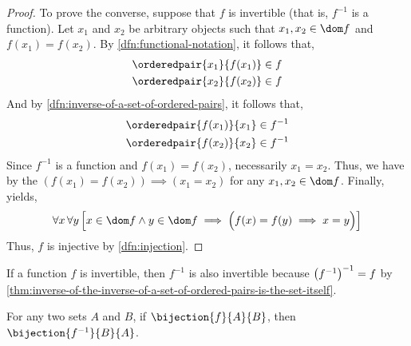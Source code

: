 \begin{proof}
    \vspace{0.3cm}
    \noindent
    To prove the converse, suppose that  \( f \) is invertible (that is, \( f^{-1} \) is a function).
    Let \( x_{1} \) and \( x_{2} \) be arbitrary objects such that \( x_{1},x_{2} \in \dom f \)
    and \( f(x_{1}) = f(x_{2}) \). By
    \cref{dfn:functional-notation}, it follows that,
    \begin{gather*}
        \orderedpair{x_{1}}{f(x_{1})} \in f \\
        \orderedpair{x_{2}}{f(x_{2})} \in f
    \end{gather*}
    And by \cref{dfn:inverse-of-a-set-of-ordered-pairs}, it follows that,
    \begin{gather*}
        \orderedpair{f(x_{1})}{x_{1}} \in f^{-1} \\
        \orderedpair{f(x_{2})}{x_{2}} \in f^{-1}
    \end{gather*}
    Since \( f^{-1} \) is a function and \( f(x_{1}) = f(x_{2}) \), necessarily \( x_{1} = x_{2} \).
    Thus, we have by the  \( (f(x_{1}) = f(x_{2})) {\implies} (x_{1} = x_{2}) \)
    for any \( x_{1}, x_{2} \in \dom f \).
    Finally,  yields,
    \begin{equation*}
        \forall x \, \forall y \, \Big[ x \in \dom f \land y \in \dom f \implies \Big( f(x) = f(y) \implies x = y \Big) \Big]
    \end{equation*}
    Thus, \( f \) is injective by \cref{dfn:injection}.
\end{proof}

\begin{cor}
    If a function \( f \) is invertible, then \( f^{-1} \) is also invertible because \( \mleft( f^{-1} \mright)^{-1} = f \) by
    \cref{thm:inverse-of-the-inverse-of-a-set-of-ordered-pairs-is-the-set-itself}.
\end{cor}

\begin{thm}
     \label{thm:the-inverse-of-a-bijection-is-also-a-bijection}
    For any two sets \( A \) and \( B \), if \( \bijection{f}{A}{B} \), then \( \bijection{f^{-1}}{B}{A} \).
\end{thm}

